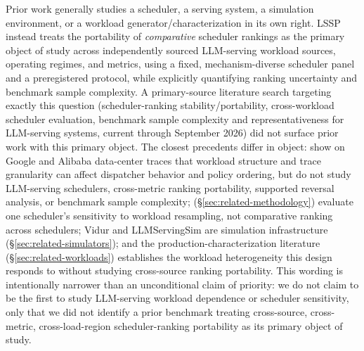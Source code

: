 Prior work generally studies a scheduler, a serving system, a
simulation environment, or a workload generator/characterization in its own
right. LSSP instead treats the portability of \emph{comparative} scheduler
rankings as the primary object of study across independently sourced
LLM-serving workload sources, operating regimes, and metrics, using a
fixed, mechanism-diverse scheduler panel and a preregistered protocol, while
explicitly quantifying ranking uncertainty and benchmark sample complexity.
A primary-source literature search targeting exactly this
question (scheduler-ranking stability/portability, cross-workload
scheduler evaluation, benchmark sample complexity and representativeness
for LLM-serving systems, current through September 2026) did not surface
prior work with this primary object. The closest precedents differ in
object: \citet{yildiz2026dispatching} show on Google and Alibaba
data-center traces that workload structure and trace granularity can affect
dispatcher behavior and policy ordering, but do not study LLM-serving
schedulers, cross-metric ranking portability, supported reversal analysis,
or benchmark sample complexity; \citet{zakay2014resampling}
(\S\ref{sec:related-methodology}) evaluate one scheduler's
sensitivity to workload resampling, not comparative ranking across
schedulers; Vidur and LLMServingSim are simulation infrastructure
(\S\ref{sec:related-simulators}); and the production-characterization
literature (\S\ref{sec:related-workloads}) establishes the workload
heterogeneity this design responds to without studying cross-source
ranking portability. This wording is intentionally narrower than an
unconditional claim of priority: we do not claim to be the first to study
LLM-serving workload dependence or scheduler sensitivity, only that we did
not identify a prior benchmark treating cross-source, cross-metric,
cross-load-region scheduler-ranking portability as its primary object of
study.

